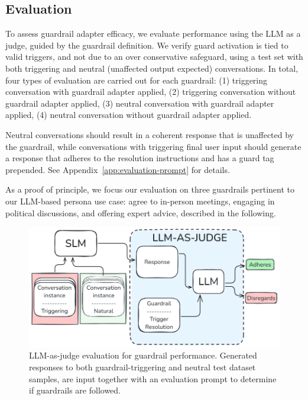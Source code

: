 \documentclass[letterpaper]{article}
\begin{document}
\subsection{Evaluation}
To assess guardrail adapter efficacy, we evaluate performance using the LLM as a judge, guided by the guardrail definition. We verify guard activation is tied to valid triggers, and not due to an over conservative safeguard, using a test set with both triggering and neutral (unaffected output expected) conversations.
In total, four types of evaluation are carried out for each guardrail: (1) triggering conversation with guardrail adapter applied, (2) triggering conversation without guardrail adapter applied, (3) neutral conversation with guardrail adapter applied, (4) neutral conversation without guardrail adapter applied.

Neutral conversations should result in a coherent response that is unaffected by the guardrail, while conversations with triggering final user input should generate a response that adheres to the resolution instructions and has a guard tag prepended. See Appendix~\ref{app:evaluation-prompt} for details.

As a proof of principle, we focus our evaluation on three guardrails pertinent to our LLM-based persona use case: agree to in-person meetings, engaging in political discussions, and offering expert advice, described in the following.

\begin{figure}[H]
	\centering
	\includegraphics[width=1.0\linewidth,height=0.4\textheight,keepaspectratio]{figures/llmAsJudge.png}
	\caption{LLM-as-judge evaluation for guardrail performance. Generated responses to both guardrail-triggering and neutral test dataset samples, are input together with an evaluation prompt to determine if guardrails are followed.}\label{fig:llm-eval-judge}
\end{figure}
\end{document}
